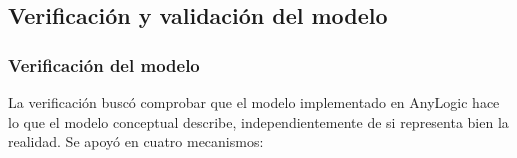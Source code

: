 \documentclass[a4paper, 11pt]{article}
\begin{document}
\newpage
\subsection{Verificaci\'on y validaci\'on del modelo}\label{sec:vyv}

\subsubsection{Verificaci\'on del modelo}\label{sub:verificacion}

La verificaci\'on busc\'o comprobar que el modelo implementado en AnyLogic hace lo
que el modelo conceptual describe, independientemente de si representa bien la
realidad. Se apoy\'o en cuatro mecanismos:
\end{document}
